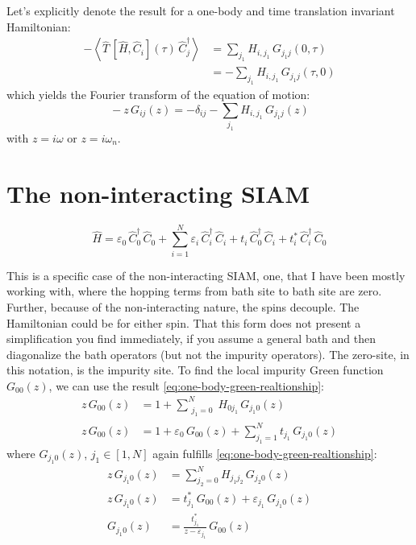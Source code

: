 Let's explicitly denote the result for a one-body and time translation invariant Hamiltonian:
\begin{align*}
    -\left\langle \hat{T}\, [\hat{H}, \hat{C}_i](\tau)\, \hat{C}_j^{\dagger} \right\rangle &= \sum_{j_1} H_{i,j_1}\, G_{j_1 j}(0, \tau) \\
    &= -\sum_{j_1} H_{i,j_1}\, G_{j_1 j}(\tau, 0)
\end{align*}
which yields the Fourier transform of the equation of motion:
\begin{equation}
    \boxed{\, -z\, G_{ij}(z) = -\delta_{ij} - \sum_{j_1} H_{i,j_1}\, G_{j_1 j}(z) \,} \label{eq:one-body-green-realtionship}
\end{equation}
with $z = i\omega$ or $z = i\omega_n$.

\section{The non-interacting SIAM}
\begin{equation*}
    \hat{H} = \varepsilon_0\, \hat{C}_{0}^{\dagger}\, \hat{C}_{0} + \sum_{i=1}^{N} \varepsilon_i\, \hat{C}_i^{\dagger}\, \hat{C}_i + t_i\, \hat{C}_0^{\dagger}\, \hat{C}_i + t_i^{*}\, \hat{C}_i^{\dagger}\, \hat{C}_0
\end{equation*}

This is a specific case of the non-interacting SIAM, one, that I have been mostly working with, where the hopping terms from bath site to bath site are zero. 
Further, because of the non-interacting nature, the spins decouple. 
The Hamiltonian could be for either spin. That this form does not present a simplification you find immediately, if
you assume a general bath and then diagonalize the bath operators (but not the impurity operators). 
The zero-site, in this notation, is the impurity site. 
To find the local impurity Green function $G_{00}(z)$, we can use the result \eqref{eq:one-body-green-realtionship}:
\begin{align}
    z\, G_{00}(z) &= 1 + \sum_{\substack{j_1 = 0}}^{N} H_{0 j_1}\, G_{j_1 0}(z) \nonumber \\
    z\, G_{00}(z) &= 1 + \varepsilon_0\, G_{00}(z) + \sum_{j_1 = 1}^{N} t_{j_1}\, G_{j_1 0}(z) \label{eq:ni-SIAM-impurity-relation}
\end{align}
where $G_{j_1 0}(z)$, $j_1 \in [1,N]$ again fulfills \eqref{eq:one-body-green-realtionship}:
\begin{align*}
    z\, G_{j_1 0}(z) &= \sum_{j_2 = 0}^{N} H_{j_1 j_2}\, G_{j_2 0}(z) \\
    z\, G_{j_1 0}(z) &= t_{j_1}^{*}\, G_{00}(z) + \varepsilon_{j_1}\, G_{j_1 0}(z) \\
    G_{j_1 0}(z) &= \frac{t_{j_1}^{*}}{z - \varepsilon_{j_1}}\, G_{00}(z)
\end{align*}

